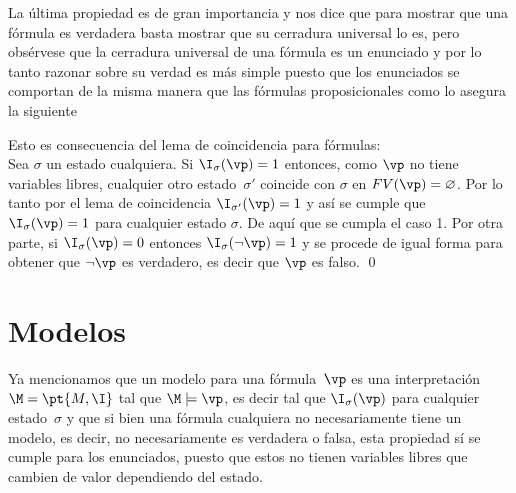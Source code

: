 \documentclass[11pt,letterpaper]{article}
\begin{document}
\espc

La última propiedad es de gran importancia y nos dice que para mostrar que una
fórmula es verdadera basta mostrar que su cerradura universal lo es, pero
obsérvese que la cerradura universal de una fórmula es un enunciado y por lo
tanto razonar sobre su verdad es más simple puesto que los enunciados se comportan de la misma manera que las fórmulas proposicionales como lo asegura la siguiente 

\proof
Esto es consecuencia del lema de coincidencia para f\'ormulas:\\
Sea $\sigma$ un estado cualquiera. Si $\inu(\vp)=1$ entonces, como $\vp$ no 
tiene variables libres, cualquier otro estado~$\sigma'$ coincide con $\sigma$ en
$FV(\vp)=\varnothing$. Por lo tanto por el lema de coincidencia $\I_{\sigma'}(\vp)=1$ y así se cumple que $\I_\sigma(\vp)=1$ para cualquier estado $\sigma$. De aquí que se cumpla el caso
1. Por otra parte, si $\inu(\vp)=0$ entonces $\inu(\neg\vp)=1$ y se procede de igual forma para
obtener que $\neg\vp$ es verdadero, es decir que $\vp$ es falso.
\qed



  

\section{Modelos}

Ya mencionamos que un modelo para una fórmula~$\vp$ es una 
interpretación~$\M=\pt{M,\I}$ tal que $\M\models\vp$, es decir tal que
$\inu(\vp)$ para cualquier estado~$\sigma$ y que si bien una fórmula
cualquiera no necesariamente tiene un modelo, es decir, no
necesariamente es verdadera o falsa, esta propiedad sí se cumple para
los enunciados, puesto que estos no tienen variables libres que
cambien de valor dependiendo del estado.\\
\end{document}
